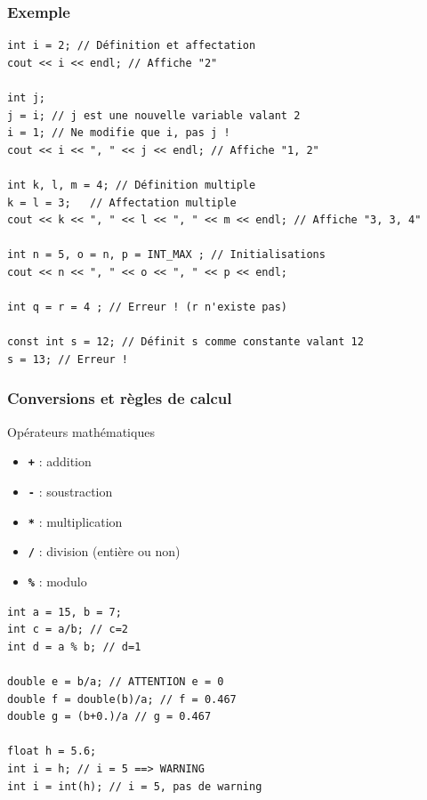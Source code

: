 \begin{frame}[fragile]
	\frametitle{Exemple}
	\begin{verbatim}
int i = 2; // Définition et affectation
cout << i << endl; // Affiche "2"

int j;
j = i; // j est une nouvelle variable valant 2
i = 1; // Ne modifie que i, pas j !
cout << i << ", " << j << endl; // Affiche "1, 2"

int k, l, m = 4; // Définition multiple
k = l = 3;   // Affectation multiple
cout << k << ", " << l << ", " << m << endl; // Affiche "3, 3, 4"

int n = 5, o = n, p = INT_MAX ; // Initialisations
cout << n << ", " << o << ", " << p << endl;

int q = r = 4 ; // Erreur ! (r n'existe pas)

const int s = 12; // Définit s comme constante valant 12
s = 13; // Erreur !
	\end{verbatim}
\end{frame}

\begin{frame}[fragile]
	\frametitle{Conversions et règles de calcul}
	\begin{minipage}{0.42\linewidth}
	\begin{block}{Opérateurs mathématiques}
		\begin{itemize}
			\item \texttt{\textbf{+}} : addition
			\item \texttt{\textbf{-}} : soustraction
			\item \texttt{\textbf{*}} : multiplication
			\item \texttt{\textbf{/}} : division (entière ou non)
			\item \texttt{\textbf{\%}} : modulo
		\end{itemize}
	\end{block}
	\end{minipage}
	\hfill
	\begin{minipage}{0.56\linewidth}
	\begin{verbatim}
int a = 15, b = 7;
int c = a/b; // c=2
int d = a % b; // d=1

double e = b/a; // ATTENTION e = 0
double f = double(b)/a; // f = 0.467
double g = (b+0.)/a // g = 0.467

float h = 5.6;
int i = h; // i = 5 ==> WARNING
int i = int(h); // i = 5, pas de warning
	\end{verbatim}
\end{minipage}
\end{frame}


